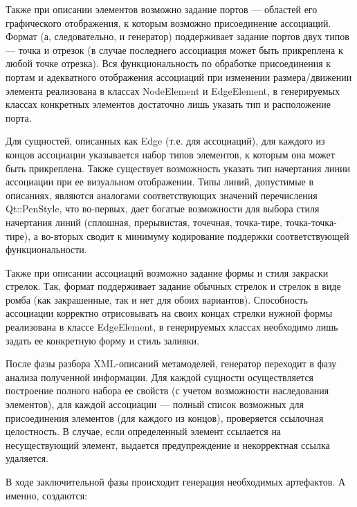 \documentclass[a5paper]{article}
\begin{document}
Также при описании элементов возможно задание портов --– областей его
графического отображения, к которым возможно присоединение ассоциаций.
Формат (а, следовательно, и генератор) поддерживает задание портов двух
типов --– точка и отрезок (в случае последнего ассоциация может быть
прикреплена к любой точке отрезка). Вся функциональность по обработке
присоединения к портам и адекватного отображения ассоциаций при
изменении размера/движении элемента реализована в классах
NodeElement и EdgeElement, в генерируемых классах
конкретных элементов достаточно лишь указать тип и расположение порта.

Для сущностей, описанных как Edge (т.е. для
ассоциаций), для каждого из концов ассоциации указывается набор типов
элементов, к которым она может быть прикреплена. Также существует
возможность указать тип начертания линии ассоциации при ее визуальном
отображении. Типы линий, допустимые в описаниях, являются аналогами
соответствующих значений перечисления Qt::PenStyle, что
во-первых, дает богатые возможности для выбора стиля начертания линий
(сплошная, прерывистая, точечная, точка-тире, точка-точка-тире), а
во-вторых сводит к минимуму кодирование поддержки соответствующей
функциональности.

Также при описании ассоциаций возможно задание формы и стиля закраски
стрелок. Так, формат поддерживает задание обычных стрелок и стрелок в
виде ромба (как закрашенные, так и нет для обоих вариантов).
Способность ассоциации корректно отрисовывать на своих концах стрелки
нужной формы реализована в классе EdgeElement, в генерируемых классах
необходимо лишь задать ее конкретную форму и стиль заливки.

После фазы разбора XML-описаний
метамоделей, генератор переходит в фазу анализа полученной информации.
Для каждой сущности осуществляется построение полного набора ее свойств
(с учетом возможности наследования элементов), для каждой ассоциации –--
полный список возможных для присоединения элементов (для каждого из
концов), проверяется ссылочная целостность. В случае, если определенный
элемент ссылается на несуществующий элемент, выдается предупреждение и
некорректная ссылка удаляется. 

В ходе заключительной фазы происходит генерация необходимых артефактов.
А именно, создаются:
\end{document}
